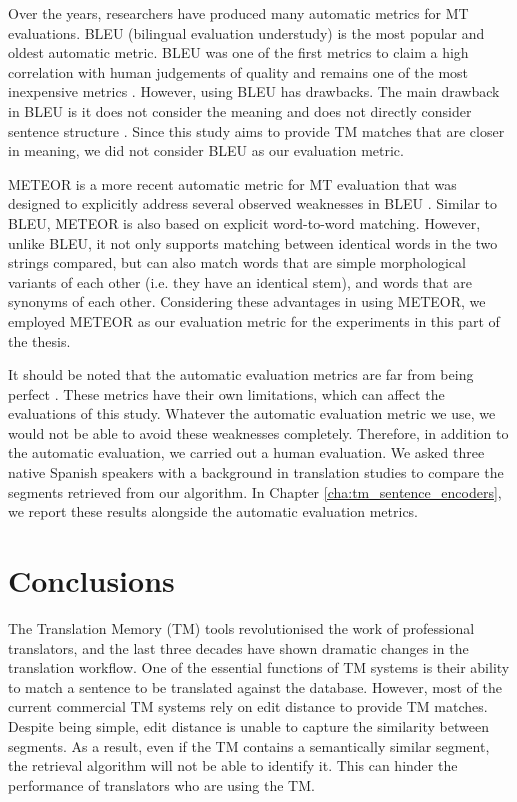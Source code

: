 Over the years, researchers have produced many automatic metrics for MT evaluations. BLEU (bilingual evaluation understudy) \autocite{papineni-etal-2002-bleu} is the most popular and oldest automatic metric. BLEU was one of the first metrics to claim a high correlation with human judgements of quality and remains one of the most inexpensive metrics \autocite{gupta-etal-2015-machine}. However, using BLEU has drawbacks. The main drawback in BLEU is it does not consider the meaning and does not directly consider sentence structure \autocite{sellam-etal-2020-bleurt}. Since this study aims to provide TM matches that are closer in meaning, we did not consider BLEU as our evaluation metric. 

METEOR is a more recent automatic metric for MT evaluation that was designed to explicitly address several observed weaknesses in BLEU \autocite{banerjee-lavie-2005-meteor}. Similar to BLEU, METEOR is also based on explicit word-to-word matching. However, unlike BLEU, it not only supports matching between identical words in the two strings compared, but can also match words that are simple morphological variants of each other (i.e. they have an identical stem), and words that are synonyms of each other. Considering these advantages in using METEOR, we employed METEOR as our evaluation metric for the experiments in this part of the thesis. 

It should be noted that the automatic evaluation metrics are far from being perfect \autocite{sellam-etal-2020-bleurt}. These metrics have their own limitations, which can affect the evaluations of this study. Whatever the automatic evaluation metric we use, we would not be able to avoid these weaknesses completely. Therefore, in addition to the automatic evaluation, we carried out a human evaluation. We asked three native Spanish speakers with a background in translation studies to compare the segments retrieved from our algorithm. In Chapter \ref{cha:tm_sentence_encoders}, we report these results alongside the automatic evaluation metrics.


\section{Conclusions}
The Translation Memory (TM) tools revolutionised the work of professional translators, and the last three decades have shown dramatic changes in the translation workflow. One of the essential functions of TM systems is their ability to match a sentence to be translated against the database. However, most of the current commercial TM systems rely on edit distance to provide TM matches. Despite being simple, edit distance is unable to capture the similarity between segments. As a result, even if the TM contains a semantically similar segment, the retrieval algorithm will not be able to identify it. This can hinder the performance of translators who are using the TM. 

